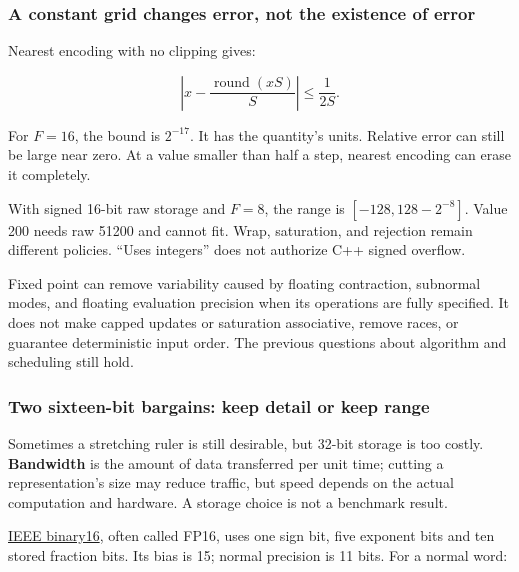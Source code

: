 \subsubsection{A constant grid changes error, not the existence of error}\label{01-foundations-i-ch001-a-constant-grid-changes-error-not-the-existence-of-error}

\hypertarget{01-foundations-i-ch001-a-constant-grid-changes-error-not-the-existence-of-error}{}

Nearest encoding with no clipping gives:

\[
\left|x-\frac{\operatorname{round}(xS)}{S}\right|\le\frac{1}{2S}.
\]

For \(F=16\), the bound is \(2^{-17}\). It has the quantity's units. Relative error can still be large near zero. At a value smaller than half a step, nearest encoding can erase it completely.

With signed 16-bit raw storage and \(F=8\), the range is \([-128,128-2^{-8}]\). Value 200 needs raw 51200 and cannot fit. Wrap, saturation, and rejection remain different policies. ``Uses integers'' does not authorize C++ signed overflow.

Fixed point can remove variability caused by floating contraction, subnormal modes, and floating evaluation precision when its operations are fully specified. It does not make capped updates or saturation associative, remove races, or guarantee deterministic input order. The previous questions about algorithm and scheduling still hold.

\subsubsection{Two sixteen-bit bargains: keep detail or keep range}\label{01-foundations-i-ch001-two-sixteen-bit-bargains-keep-detail-or-keep-range}

\hypertarget{01-foundations-i-ch001-two-sixteen-bit-bargains-keep-detail-or-keep-range}{}

Sometimes a stretching ruler is still desirable, but 32-bit storage is too costly. \textbf{Bandwidth} is the amount of data transferred per unit time; cutting a representation's size may reduce traffic, but speed depends on the actual computation and hardware. A storage choice is not a benchmark result.

\hyperref[appendix-34443cec7170]{IEEE binary16}, often called FP16, uses one sign bit, five exponent bits and ten stored fraction bits. Its bias is 15; normal precision is 11 bits. For a normal word:

